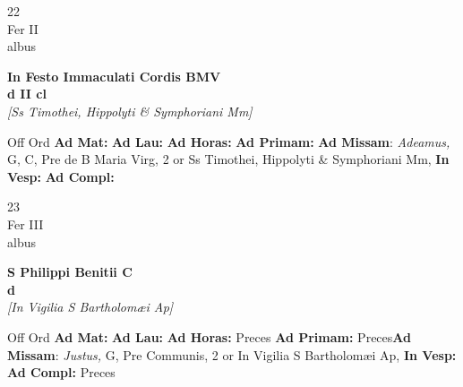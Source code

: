 \documentclass[10pt, openany]{book}
\begin{document}
    \begin{center}
        \begin{minipage}{3.5in}
            \vspace{2em}
            \begin{minipage}{0.5in}
                {\Huge 22} \\
                {\normalsize Fer II} \\
                {\normalsize albus}
            \end{minipage}
            \begin{minipage}{3.0in}
                \textbf{ \large In Festo Immaculati Cordis BMV \\
                \textnormal{\normalsize d II cl}} \\ \textit{[Ss Timothei, Hippolyti \& Symphoriani Mm]} \\ 
            \end{minipage}
            \begin{justify}Off Ord
                \textbf{Ad Mat: }
                \textbf{Ad Lau: }
                \textbf{Ad Horas: }
                \textbf{Ad Primam: }\textbf{Ad Missam}: \textit{Adeamus,} G, C, Pre de B Maria Virg, 2 or Ss Timothei, Hippolyti \& Symphoriani Mm,  
                \textbf{In Vesp: }
                \textbf{Ad Compl: }
            \end{justify}
        \end{minipage}
    \end{center}

    \begin{center}
        \begin{minipage}{3.5in}
            \vspace{2em}
            \begin{minipage}{0.5in}
                {\Huge 23} \\
                {\normalsize Fer III} \\
                {\normalsize albus}
            \end{minipage}
            \begin{minipage}{3.0in}
                \textbf{ \large S Philippi Benitii C \\
                \textnormal{\normalsize d}} \\ \textit{[In Vigilia S Bartholomæi Ap]} \\ 
            \end{minipage}
            \begin{justify}Off Ord
                \textbf{Ad Mat: }
                \textbf{Ad Lau: }
                \textbf{Ad Horas: }Preces
                \textbf{Ad Primam: }Preces\textbf{Ad Missam}: \textit{Justus,} G, Pre Communis, 2 or In Vigilia S Bartholomæi Ap,  
                \textbf{In Vesp: }
                \textbf{Ad Compl: }Preces
            \end{justify}
        \end{minipage}
    \end{center}
\end{document}
